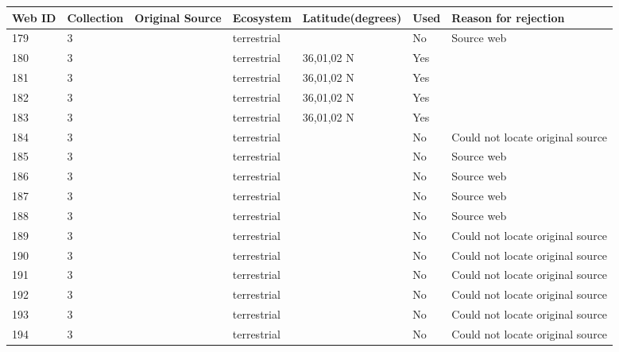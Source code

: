 \documentclass[12pt]{article}
\begin{document}
\begin{landscape}
        \newpage

    \begin{table}[h!]
    \centering
    {\footnotesize
      \begin{tabular}{p{2.8cm}p{1.3cm}p{5.5cm}p{2.2cm}p{2.5cm}lp{3.5cm}}
        \hline
        Web ID & Collection & Original Source & Ecosystem & Latitude(degrees) & Used  & Reason for rejection  \\
        \hline
        179   & 3 & \cite{Robinson1953}  & terrestrial &       & No    & Source web \\
        180   & 3 & \cite{Savely1939}    & terrestrial & 36,01,02 N & Yes   &       \\
        181   & 3 & \cite{Savely1939}    & terrestrial & 36,01,02 N & Yes   &       \\
        182   & 3 & \cite{Savely1939}    & terrestrial & 36,01,02 N & Yes   &       \\
        183   & 3 & \cite{Savely1939}    & terrestrial & 36,01,02 N & Yes   &       \\
        184   & 3 & \cite{Beaver1972}     & terrestrial &       & No    & Could not locate original source \\
        185   & 3 & \cite{Chapman1955}     & terrestrial &       & No    & Source web \\
        186   & 3 & \cite{Cornaby1974}  & terrestrial &       & No    & Source web \\
        187   & 3 & \cite{Cornaby1974}  & terrestrial &       & No    & Source web \\
        188   & 3 & \cite{Jiron1981}  & terrestrial &       & No    & Source web \\
        189   & 3 & \cite{McKinnerney1978}    & terrestrial &       & No    & Could not locate original source \\
        190   & 3 & \cite{McKinnerney1978}    & terrestrial &       & No    & Could not locate original source \\
        191   & 3 & \cite{McKinnerney1978}    & terrestrial &       & No    & Could not locate original source \\
        192   & 3 & \cite{McKinnerney1978}    & terrestrial &       & No    & Could not locate original source \\
        193   & 3 & \cite{McKinnerney1978}    & terrestrial &       & No    & Could not locate original source \\
        194   & 3 & \cite{McKinnerney1978}    & terrestrial &       & No    & Could not locate original source \\

\end{tabular}}
\end{table}
\end{landscape}
\end{document}
